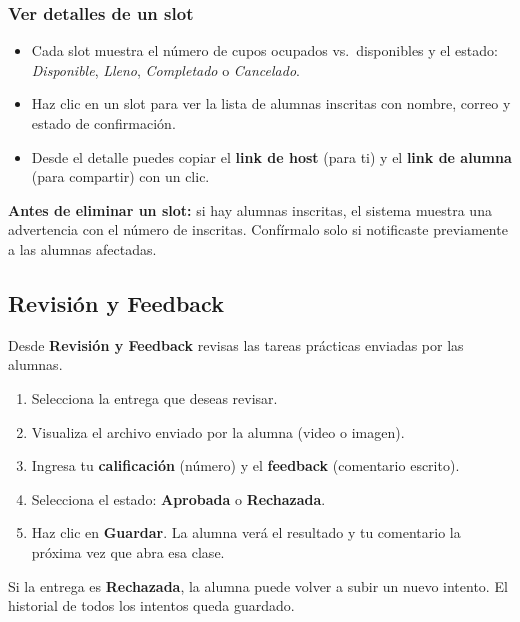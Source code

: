 \documentclass[a4paper,11pt]{article}
\begin{document}
\subsubsection{Ver detalles de un slot}

\begin{itemize}
  \item Cada slot muestra el n\'umero de cupos ocupados vs.\ disponibles
        y el estado: \emph{Disponible}, \emph{Lleno}, \emph{Completado}
        o \emph{Cancelado}.
  \item Haz clic en un slot para ver la lista de alumnas inscritas con
        nombre, correo y estado de confirmaci\'on.
  \item Desde el detalle puedes copiar el \textbf{link de host} (para ti)
        y el \textbf{link de alumna} (para compartir) con un clic.
\end{itemize}

\begin{warnbox}
\textbf{Antes de eliminar un slot:} si hay alumnas inscritas, el sistema muestra
una advertencia con el n\'umero de inscritas. Conf\'irmalo solo si notificaste
previamente a las alumnas afectadas.
\end{warnbox}

\subsection{Revisi\'on y Feedback}

Desde \textbf{Revisi\'on y Feedback} revisas las tareas pr\'acticas enviadas
por las alumnas.

\begin{enumerate}
  \item Selecciona la entrega que deseas revisar.
  \item Visualiza el archivo enviado por la alumna (video o imagen).
  \item Ingresa tu \textbf{calificaci\'on} (n\'umero) y el \textbf{feedback}
        (comentario escrito).
  \item Selecciona el estado: \textbf{Aprobada} o \textbf{Rechazada}.
  \item Haz clic en \textbf{Guardar}. La alumna ver\'a el resultado y tu
        comentario la pr\'oxima vez que abra esa clase.
\end{enumerate}

\begin{infobox}
Si la entrega es \textbf{Rechazada}, la alumna puede volver a subir un nuevo
intento. El historial de todos los intentos queda guardado.
\end{infobox}
\end{document}
